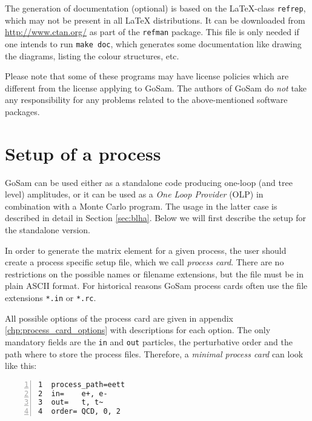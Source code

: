 \documentclass[11pt,a4paper]{refrep}
\newcommand{\gosamversion}{{3{.}0}}
\newcommand{\gosam}{{\sc GoSam}\xspace}
\newcommand{\gosamv}[1][\gosamversion]{{\sc GoSam}\xspace}
\begin{document}
 The generation of documentation (optional)
is based on the \LaTeX-class \texttt{refrep}, which may not be
present in all \LaTeX{}
distributions. It can be downloaded from \url{http://www.ctan.org/}
as part of the \texttt{refman} package.
This file is only needed if one intends to run \texttt{make doc},
which generates some documentation like drawing the diagrams, 
listing the colour structures, etc.

\attention Please note that some of these programs may have
license policies which are different from the license
applying to \gosamv. The authors of \gosamv do \emph{not}
take any responsibility for any problems related to the
above-mentioned software packages.



\chapter{Setup of a process}
\label{chp:setup-of-a-process}


\gosam{} can be used either as a standalone code producing one-loop 
(and tree level) amplitudes, or it can be used as a {\it One Loop Provider} (OLP)
in combination with a Monte Carlo program. 
The usage in the latter case is described in detail in Section \ref{sec:blha}. 
Below we will first describe the setup for the standalone version.


In order to generate the matrix element for a given process, the user should
create a process specific setup file, which we call {\em process card}. There
are no restrictions on the possible names or filename extensions, but the file
must be in plain ASCII format. For historical reasons \gosam process cards often
use the file extensions \texttt{*.in} or \texttt{*.rc}.

All possible options of the process card are given in appendix \ref{chp:process_card_options} with descriptions for each option.
The only mandatory fields are the {\tt in} and {\tt out} 
particles, the perturbative order and the path where to store the process files.
Therefore, a {\em minimal process card} can look like this:
\begin{lstlisting}[gobble=3,%
     numbers=left,caption={{\tt eett.in}},%
     basicstyle=\ttfamily]
1  process_path=eett
2  in=    e+, e-
3  out=   t, t~
4  order= QCD, 0, 2
\end{lstlisting}
\end{document}
